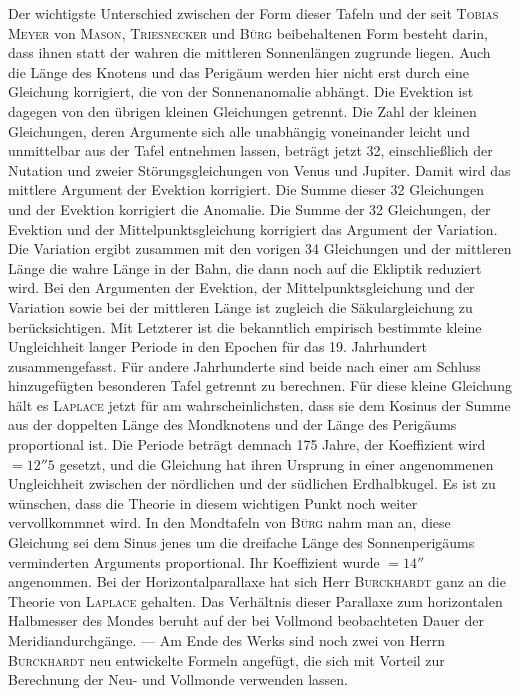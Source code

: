 Der wichtigste Unterschied zwischen der Form dieser Tafeln und der seit \textsc{Tobias Meyer} von \textsc{Mason}, \textsc{Triesnecker} und \textsc{Bürg} beibehaltenen Form besteht darin, dass ihnen statt der wahren die mittleren Sonnenlängen zugrunde liegen. Auch die Länge des Knotens und das Perigäum werden hier nicht erst durch eine Gleichung korrigiert, die von der Sonnenanomalie abhängt. Die Evektion ist dagegen von den übrigen kleinen Gleichungen getrennt. Die Zahl der kleinen Gleichungen, deren Argumente sich alle unabhängig voneinander leicht und unmittelbar aus der Tafel entnehmen lassen, beträgt jetzt 32, einschließlich der Nutation und zweier Störungsgleichungen von Venus und Jupiter. Damit wird das mittlere Argument der Evektion korrigiert. Die Summe dieser 32 Gleichungen und der Evektion korrigiert die Anomalie. Die Summe der 32 Gleichungen, der Evektion und der Mittelpunktsgleichung korrigiert das Argument der Variation. Die Variation ergibt zusammen mit den vorigen 34 Gleichungen und der mittleren Länge die wahre Länge in der Bahn, die dann noch auf die Ekliptik reduziert wird. Bei den Argumenten der Evektion, der Mittelpunktsgleichung und der Variation sowie bei der mittleren Länge ist zugleich die Säkulargleichung zu berücksichtigen. Mit Letzterer ist die bekanntlich empirisch bestimmte kleine Ungleichheit langer Periode in den Epochen für das 19. Jahrhundert zusammengefasst. Für andere Jahrhunderte sind beide nach einer am Schluss hinzugefügten besonderen Tafel getrennt zu berechnen. Für diese kleine Gleichung hält es \textsc{Laplace} jetzt für am wahrscheinlichsten, dass sie dem Kosinus der Summe aus der doppelten Länge des Mondknotens und der Länge des Perigäums proportional ist. Die Periode beträgt demnach 175 Jahre, der Koeffizient wird $= 12''5$ gesetzt, und die Gleichung hat ihren Ursprung in einer angenommenen Ungleichheit zwischen der nördlichen und der südlichen Erdhalbkugel. Es ist zu wünschen, dass die Theorie in diesem wichtigen Punkt noch weiter vervollkommnet wird. In den Mondtafeln von \textsc{Bürg} nahm man an, diese Gleichung sei dem Sinus jenes um die dreifache Länge des Sonnenperigäums verminderten Arguments proportional. Ihr Koeffizient wurde $= 14''$ angenommen. Bei der Horizontalparallaxe hat sich Herr \textsc{Burckhardt} ganz an die Theorie von \textsc{Laplace} gehalten. Das Verhältnis dieser Parallaxe zum horizontalen Halbmesser des Mondes beruht auf der bei Vollmond beobachteten Dauer der Meridiandurchgänge. --- Am Ende des Werks sind noch zwei von Herrn \textsc{Burckhardt} neu entwickelte Formeln angefügt, die sich mit Vorteil zur Berechnung der Neu- und Vollmonde verwenden lassen.
